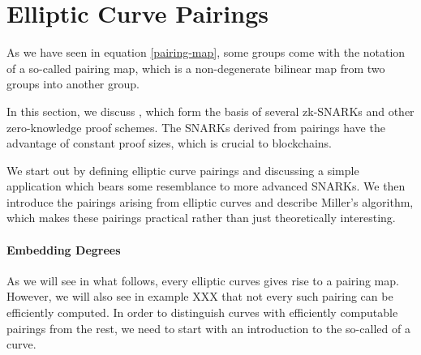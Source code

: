
\section{Elliptic Curve Pairings} As we have seen in equation \ref{pairing-map}, some groups come with the notation of a so-called pairing map, which is a non-degenerate bilinear map from two groups into another group.

In this section, we discuss , which form the basis of several zk-SNARKs and other zero-knowledge proof schemes. The SNARKs derived from pairings have the advantage of constant proof sizes, which is crucial to blockchains. 

We start out by defining elliptic curve pairings and discussing a simple application which bears some resemblance to more advanced SNARKs. We then introduce the pairings arising from elliptic curves and describe Miller's algorithm, which makes these pairings practical rather than just theoretically interesting.


\paragraph{Embedding Degrees}As we will see in what follows, every elliptic curves gives rise to a pairing map. However, we will also see in example XXX that not every such pairing can be efficiently computed. In order to distinguish curves with efficiently computable pairings from the rest, we need to start with an introduction to the so-called  of a curve. 

